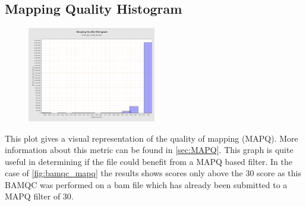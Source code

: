 \subsection{Mapping Quality Histogram \label{subsec:bamqc_mapq}}
\begin{figure}
  \begin{center}
    \includegraphics[width=0.5\textwidth]{figures/bamqc_mapq.png}
  \end{center}
  \label{fig:bamqc_mapq}
\end{figure}
This plot gives a visual representation of the quality of mapping (MAPQ). More information about this metric can be found in \autoref{sec:MAPQ}. This graph is quite useful in determining if the file could benefit from a MAPQ based filter. In the case of \autoref{fig:bamqc_mapq} the results shows scores only above the 30 score as this BAMQC was performed on a bam file which has already been submitted to a MAPQ filter of 30.
